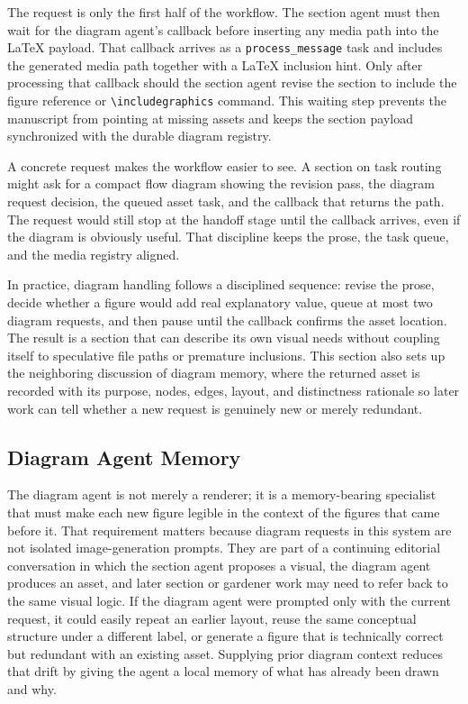 \documentclass[11pt]{article}
\begin{document}
The request is only the first half of the workflow. The section agent must then wait for the diagram agent's callback before inserting any media path into the \LaTeX{} payload. That callback arrives as a \texttt{process\_message} task and includes the generated media path together with a \LaTeX{} inclusion hint. Only after processing that callback should the section agent revise the section to include the figure reference or \texttt{\textbackslash includegraphics} command. This waiting step prevents the manuscript from pointing at missing assets and keeps the section payload synchronized with the durable diagram registry.

A concrete request makes the workflow easier to see. A section on task routing might ask for a compact flow diagram showing the revision pass, the diagram request decision, the queued asset task, and the callback that returns the path. The request would still stop at the handoff stage until the callback arrives, even if the diagram is obviously useful. That discipline keeps the prose, the task queue, and the media registry aligned.

In practice, diagram handling follows a disciplined sequence: revise the prose, decide whether a figure would add real explanatory value, queue at most two diagram requests, and then pause until the callback confirms the asset location. The result is a section that can describe its own visual needs without coupling itself to speculative file paths or premature inclusions. This section also sets up the neighboring discussion of diagram memory, where the returned asset is recorded with its purpose, nodes, edges, layout, and distinctness rationale so later work can tell whether a new request is genuinely new or merely redundant.



\subsection{Diagram Agent Memory}


The diagram agent is not merely a renderer; it is a memory-bearing specialist that must make each new figure legible in the context of the figures that came before it. That requirement matters because diagram requests in this system are not isolated image-generation prompts. They are part of a continuing editorial conversation in which the section agent proposes a visual, the diagram agent produces an asset, and later section or gardener work may need to refer back to the same visual logic. If the diagram agent were prompted only with the current request, it could easily repeat an earlier layout, reuse the same conceptual structure under a different label, or generate a figure that is technically correct but redundant with an existing asset. Supplying prior diagram context reduces that drift by giving the agent a local memory of what has already been drawn and why.
\end{document}

